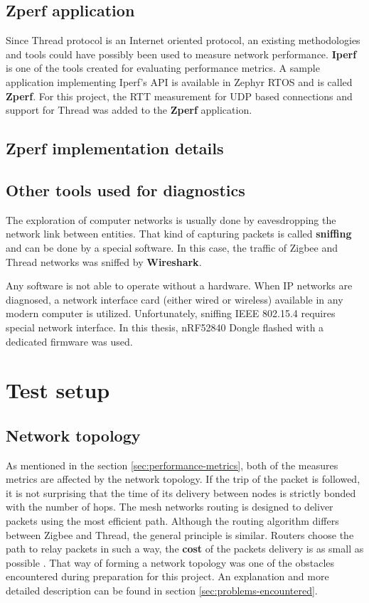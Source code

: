 \subsection{Zperf application}
\label{sec:zperf}

Since Thread protocol is an Internet oriented protocol, an existing methodologies and tools could have possibly been used to measure network performance. \textbf{Iperf} is one of the tools created for evaluating performance metrics. A sample application implementing Iperf's API is available in Zephyr RTOS and is called \textbf{Zperf}. For this project, the RTT measurement for UDP based connections and support for Thread was added to the \textbf{Zperf} application.

\subsection*{Zperf implementation details}

\subsection{Other tools used for diagnostics}
\label{sec:tools}

The exploration of computer networks is usually done by eavesdropping the network link between entities. That kind of capturing packets is called \textbf{sniffing} and can be done by a special software. In this case, the traffic of Zigbee and Thread networks was sniffed by \textbf{Wireshark}. 

Any software is not able to operate without a hardware. When IP networks are diagnosed, a network 
interface card (either wired or wireless) available in any modern computer is utilized. Unfortunately, 
sniffing IEEE 802.15.4 requires special network interface. In this thesis, nRF52840 Dongle flashed with 
a dedicated firmware was used.

\medskip
\section{Test setup}
\subsection{Network topology}
\label{sec:network-topology}

As mentioned in the section \ref{sec:performance-metrics}, both of the measures metrics are affected by
the network topology. If the trip of the packet is followed, it is not surprising that the time of its 
delivery between nodes is strictly bonded with the number of hops. The mesh networks routing is designed to deliver packets using the most efficient path. Although the routing algorithm differs between Zigbee and Thread,
the general principle is similar. Routers choose the path to relay packets in such a way, the \textbf{cost}
of the packets delivery is as small as possible \cite{TexasZigbeeVsThread}. That way of forming a network topology
was one of the obstacles encountered during preparation for this project. An explanation and more detailed
description can be found in section \ref{sec:problems-encountered}.


